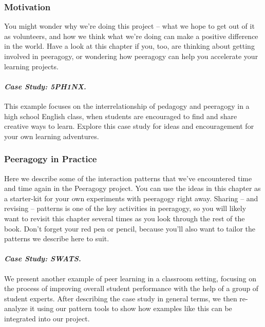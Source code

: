 \subsubsection{Motivation}\label{motivation}

You might wonder why we're doing this project -- what we hope to get out
of it as volunteers, and how we think what we're doing can make a
positive difference in the world. Have a look at this chapter if you,
too, are thinking about getting involved in peeragogy, or wondering how
peeragogy can help you accelerate your learning projects.

\paragraph{\emph{Case Study: 5PH1NX.}}\label{case-study-5ph1nx.}

This example focuses on the interrelationship of pedagogy and peeragogy
in a high school English class, when students are encouraged to find and
share creative ways to learn. Explore this case study for ideas and
encouragement for your own learning adventures.

\subsubsection{Peeragogy in Practice}\label{peeragogy-in-practice}

Here we describe some of the interaction patterns that we've encountered
time and time again in the Peeragogy project. You can use the ideas in
this chapter as a starter-kit for your own experiments with peeragogy
right away. Sharing -- and revising -- patterns is one of the key
activities in peeragogy, so you will likely want to revisit this chapter
several times as you look through the rest of the book. Don't forget
your red pen or pencil, because you'll also want to tailor the patterns
we describe here to suit.

\paragraph{\emph{Case Study: SWATS.}}\label{case-study-swats.}

We present another example of peer learning in a classroom setting,
focusing on the process of improving overall student performance with
the help of a group of student experts. After describing the case study
in general terms, we then re-analyze it using our pattern tools to show
how examples like this can be integrated into our project.

